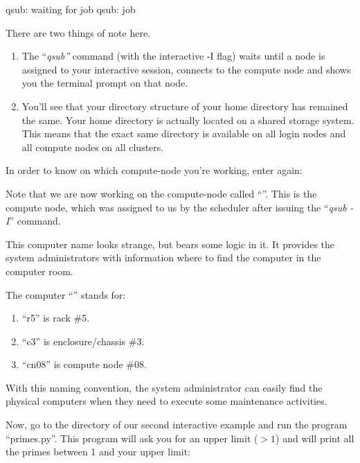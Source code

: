 \begin{prompt}
qsub: waiting for job %
qsub: job %
\end{prompt}

There are two things of note here.

\begin{enumerate}
  \item  The ``\emph{qsub''} command (with the interactive -I
      flag) waits until a node is assigned to your interactive session,
      connects to the compute node and shows you the terminal prompt on that
      node.
  \item  You'll see that your directory structure of your home directory has
      remained the same. Your home directory is actually located on a shared
      storage system. This means that the exact same directory is available
      on all login nodes and all compute nodes on all clusters.
\end{enumerate}

In order to know on which compute-node you're working, enter again:

\begin{prompt}
\end{prompt}

Note that we are now working on the compute-node called ``\emph{\computenode}''.
This is the compute node, which was assigned to us by the scheduler after
issuing the ``\emph{qsub -I}'' command.

\ifantwerpen
This computer name looks strange, but bears some logic in it.  It provides the
system administrators with information where to find the computer in the
computer room.

The computer ``\emph{\computenodeshort}'' stands for:

\begin{enumerate}
\item  ``r5'' is rack \#5.
\item  ``c3'' is enclosure/chassis \#3.
\item  ``cn08'' is compute node \#08.
\end{enumerate}

With this naming convention, the system administrator can easily find the
physical computers when they need to execute some maintenance activities.
\fi

Now, go to the directory of our second interactive example and run the program
``primes.py''. This program will ask you for an upper limit ($> 1$) and will
print all the primes between 1 and your upper limit:

